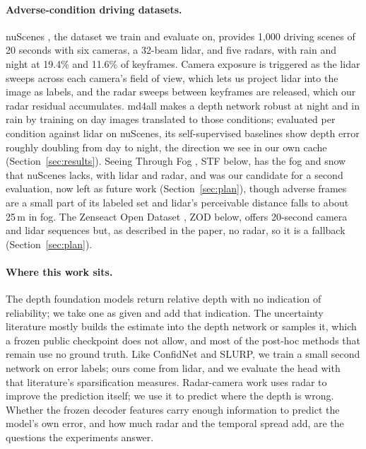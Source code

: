\paragraph{Adverse-condition driving datasets.}
nuScenes \citep{caesar2020nuscenes}, the dataset we train and evaluate on, provides 1,000 driving scenes of 20 seconds with six cameras, a 32-beam lidar, and five radars, with rain and night at 19.4\% and 11.6\% of keyframes. Camera exposure is triggered as the lidar sweeps across each camera's field of view, which lets us project lidar into the image as labels, and the radar sweeps between keyframes are released, which our radar residual accumulates. md4all \citep{gasperini2023md4all} makes a depth network robust at night and in rain by training on day images translated to those conditions; evaluated per condition against lidar on nuScenes, its self-supervised baselines show depth error roughly doubling from day to night, the direction we see in our own cache (Section~\ref{sec:results}).
Seeing Through Fog \citep{bijelic2020seeing}, STF below, has the fog and snow that nuScenes lacks, with lidar and radar, and was our candidate for a second evaluation, now left as future work (Section~\ref{sec:plan}), though adverse frames are a small part of its labeled set and lidar's perceivable distance falls to about 25\,m in fog.
The Zenseact Open Dataset \citep{alibeigi2023zod}, ZOD below, offers 20-second camera and lidar sequences but, as described in the paper, no radar, so it is a fallback (Section~\ref{sec:plan}).

\paragraph{Where this work sits.}
The depth foundation models return relative depth with no indication of reliability; we take one as given and add that indication. The uncertainty literature mostly builds the estimate into the depth network or samples it, which a frozen public checkpoint does not allow, and most of the post-hoc methods that remain use no ground truth. Like ConfidNet and SLURP, we train a small second network on error labels; ours come from lidar, and we evaluate the head with that literature's sparsification measures. Radar-camera work uses radar to improve the prediction itself; we use it to predict where the depth is wrong. Whether the frozen decoder features carry enough information to predict the model's own error, and how much radar and the temporal spread add, are the questions the experiments answer.
